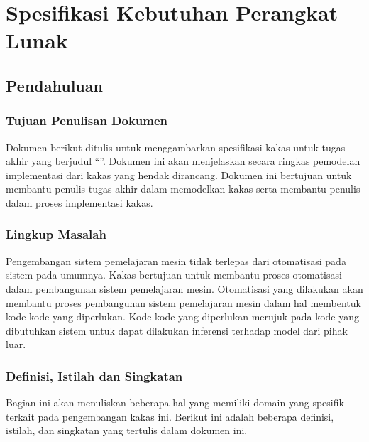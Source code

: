 \chapter{Spesifikasi Kebutuhan Perangkat Lunak}

\section{Pendahuluan}

\subsection{Tujuan Penulisan Dokumen}

Dokumen berikut ditulis untuk menggambarkan spesifikasi kakas untuk tugas akhir yang berjudul ``\thesistitle''.
Dokumen ini akan menjelaskan secara ringkas pemodelan implementasi dari kakas yang hendak dirancang.
Dokumen ini bertujuan untuk membantu penulis tugas akhir dalam memodelkan kakas serta membantu penulis dalam proses implementasi kakas.

\subsection{Lingkup Masalah}

Pengembangan sistem pemelajaran mesin tidak terlepas dari otomatisasi pada sistem pada umumnya.
Kakas bertujuan untuk membantu proses otomatisasi dalam pembangunan sistem pemelajaran mesin.
Otomatisasi yang dilakukan akan membantu proses pembangunan sistem pemelajaran mesin dalam hal membentuk kode-kode yang diperlukan.
Kode-kode yang diperlukan merujuk pada kode yang dibutuhkan sistem untuk dapat dilakukan inferensi terhadap model dari pihak luar.

\subsection{Definisi, Istilah  dan Singkatan}

Bagian ini akan menuliskan beberapa hal yang memiliki domain yang spesifik terkait pada pengembangan kakas ini.
Berikut ini adalah beberapa definisi, istilah, dan singkatan yang tertulis dalam dokumen ini.

